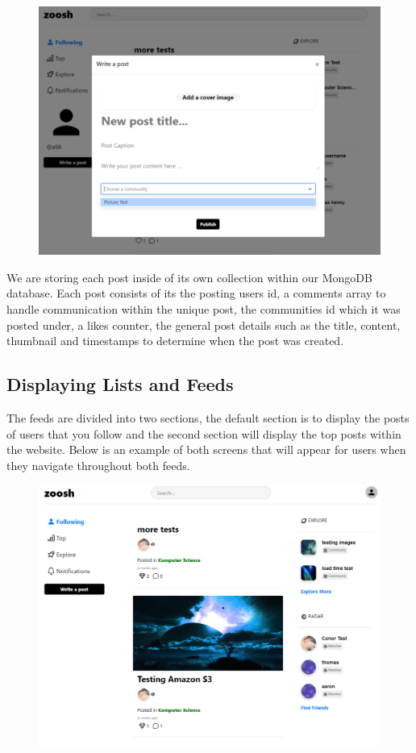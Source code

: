 \begin{figure}[H]
  \centering
  \includegraphics[scale=0.35]{img/createpost.PNG}
  \label{fig:Create Post Modal.}
\end{figure}

We are storing each post inside of its own collection within our MongoDB database. Each post consists of its the posting users id, a comments array to handle communication within the unique post, the communities id which it was posted under, a likes counter, the general post details such as the title, content, thumbnail and timestamps to determine when the post was created. 

\newpage
\subsection{Displaying Lists and Feeds}

The feeds are divided into two sections, the default section is to display the posts of users that you follow and the second section will display the top posts within the website. Below is an example of both screens that will appear for users when they navigate throughout both feeds.

\begin{figure}[H]
  \centering
  \includegraphics[scale=0.35]{img/following.PNG}
  \label{fig:Following Feed.}
\end{figure}

